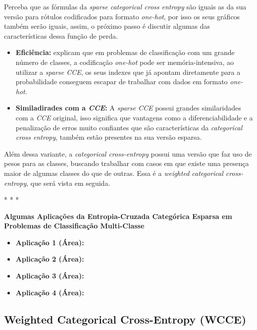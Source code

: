 Perceba que as fórmulas da \textit{sparse categorical cross entropy} são iguais as da sua versão para rótulos codificados para formato \textit{one-hot}, por isso os seus gráficos também serão iguais, assim, o próximo passo é discutir algumas das características dessa função de perda.

\begin{itemize}
    \item \textbf{Eficiência:} \textcite{LossesArticle} explicam que em problemas de classificação com um grande número de classes, a codificação \textit{one-hot} pode ser memória-intensiva, ao utilizar a \textit{sparse CCE}, os seus indexes que já apontam diretamente para a probabilidade conseguem escapar de trabalhar com dados em formato \textit{one-hot}.
    \item \textbf{Similadirades com a \textit{CCE}:} A \textit{sparse CCE} possui grandes similaridades com a \textit{CCE} original, isso significa que vantagens como a diferenciabilidade e a penalização de erros muito confiantes que são características da \textit{categorical cross entropy}, também estão presentes na sua versão esparsa.
\end{itemize}

Além dessa variante, a \textit{categorical cross-entropy} possui uma versão que faz uso de pesos para as classes, buscando trabalhar com casos em que existe uma presença maior de algumas classes do que de outras. Essa é a \textit{weighted categorical cross-entropy}, que será vista em seguida.

\medskip
\begin{center}
 * * *
\end{center}
\medskip

\textbf{Algumas Aplicações da Entropia-Cruzada Categórica Esparsa em Problemas de Classificação Multi-Classe}

\begin{itemize}
    \item \textbf{Aplicação 1 (Área):}
    \item \textbf{Aplicação 2 (Área):}
    \item \textbf{Aplicação 3 (Área):}
    \item \textbf{Aplicação 4 (Área):}
\end{itemize}

\subsection{Weighted Categorical Cross-Entropy (WCCE)}

